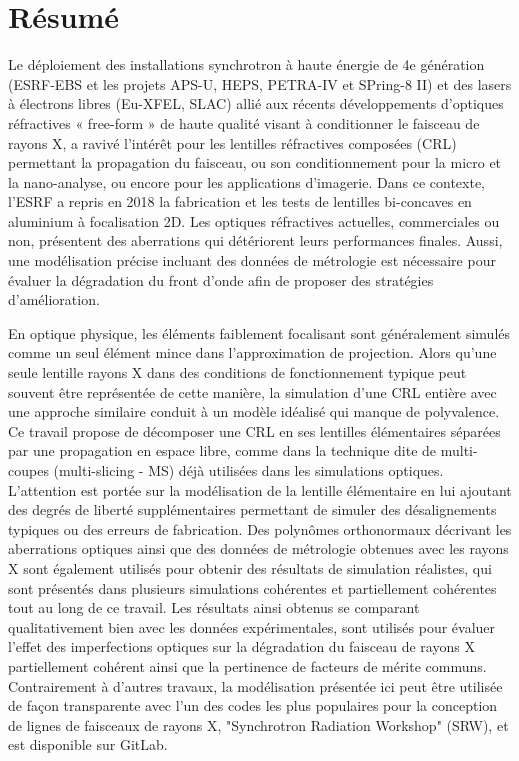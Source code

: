 \chapter*{Résumé}
\label{sec:abstractFR}
\vspace*{-10mm}

Le déploiement des installations synchrotron à haute énergie de 4e génération (ESRF-EBS et les projets APS-U, HEPS, PETRA-IV et SPring-8 II) et des lasers à électrons libres (Eu-XFEL, SLAC) allié aux récents développements d’optiques réfractives « free-form » de haute qualité visant à conditionner le faisceau de rayons X, a ravivé l’intérêt pour les lentilles réfractives composées (CRL) permettant la propagation du faisceau, ou son conditionnement pour la micro et la nano-analyse, ou encore pour les applications d’imagerie. Dans ce contexte, l'ESRF a repris en 2018 la fabrication et les tests de lentilles bi-concaves en aluminium à focalisation 2D. Les optiques réfractives actuelles, commerciales ou non, présentent des aberrations qui détériorent leurs performances finales. Aussi, une modélisation précise incluant des données de métrologie est nécessaire pour évaluer la dégradation du front d'onde afin de proposer des stratégies d’amélioration. 

En optique physique, les éléments faiblement focalisant sont généralement simulés comme un seul élément mince dans l'approximation de projection. Alors qu'une seule lentille rayons X dans des conditions de fonctionnement typique peut souvent être représentée de cette manière, la simulation d'une CRL entière avec une approche similaire conduit à un modèle idéalisé qui manque de polyvalence. Ce travail propose de décomposer une CRL en ses lentilles élémentaires séparées par une propagation en espace libre, comme dans la technique dite de multi-coupes (multi-slicing - MS) déjà utilisées dans les simulations optiques. L'attention est portée sur la modélisation de la lentille élémentaire en lui ajoutant des degrés de liberté supplémentaires permettant de simuler des désalignements typiques ou des erreurs de fabrication. Des polynômes orthonormaux décrivant les aberrations optiques ainsi que des données de métrologie obtenues avec les rayons X sont également utilisés pour obtenir des résultats de simulation réalistes, qui sont présentés dans plusieurs simulations cohérentes et partiellement cohérentes tout au long de ce travail. Les résultats ainsi obtenus se comparant qualitativement bien avec les données expérimentales, sont utilisés pour évaluer l'effet des imperfections optiques sur la dégradation du faisceau de rayons X partiellement cohérent ainsi que la pertinence de facteurs de mérite communs. Contrairement à d'autres travaux, la modélisation présentée ici peut être utilisée de façon transparente avec l'un des codes les plus populaires pour la conception de lignes de faisceaux de rayons X, "Synchrotron Radiation Workshop" (SRW), et est disponible sur GitLab.

